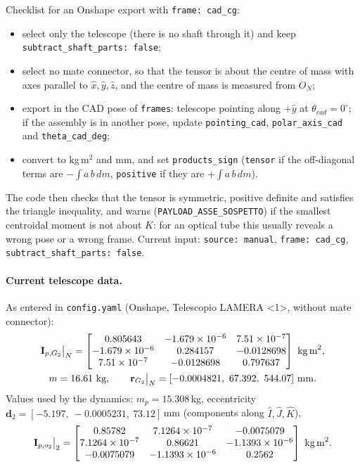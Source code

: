 \documentclass[10pt,a4paper]{article}
\numberwithin{equation}{section}
\begin{document}
Checklist for an Onshape export with \texttt{frame: cad\_cg}:
\begin{itemize}
\item select only the telescope (there is no shaft through it) and keep \texttt{subtract\_shaft\_parts: false};
\item select no mate connector, so that the tensor is about the centre of mass with axes parallel to $\hat x, \hat y, \hat z$, and the centre of mass is measured from $O_N$;
\item export in the CAD pose of \texttt{frames}: telescope pointing along $+\hat{y}$ at $\theta_{cad} = 0^\circ$; if the assembly is in another pose, update \texttt{pointing\_cad}, \texttt{polar\_axis\_cad} and \texttt{theta\_cad\_deg};
\item convert to kg\,m$^2$ and mm, and set \texttt{products\_sign} (\texttt{tensor} if the off-diagonal terms are $-\int a\,b\,dm$, \texttt{positive} if they are $+\int a\,b\,dm$).
\end{itemize}
The code then checks that the tensor is symmetric, positive definite and satisfies the triangle inequality, and warns (\texttt{PAYLOAD\_ASSE\_SOSPETTO}) if the smallest centroidal moment is not about $\hat K$: for an optical tube this usually reveals a wrong pose or a wrong frame. Current input: \texttt{source: manual}, \texttt{frame: cad\_cg}, \texttt{subtract\_shaft\_parts: false}.
\paragraph{Current telescope data.}
As entered in \texttt{config.yaml} (Onshape, Telescopio LAMERA <1>, without mate connector):
\begin{gather}\mathbf I_{p,G_2}\big|_N = \begin{bmatrix}0.805643 & -1.679\times10^{-6} & 7.51\times10^{-7} \\ -1.679\times10^{-6} & 0.284157 & -0.0128698 \\ 7.51\times10^{-7} & -0.0128698 & 0.797637\end{bmatrix}\ \text{kg\,m}^2, \\ m = 16.61\ \text{kg}, \qquad \mathbf r_{G_2}\big|_N = [-0.0004821,\ 67.392,\ 544.07]\ \text{mm}.\end{gather}
Values used by the dynamics: $m_p = 15.308$\,kg, eccentricity $\mathbf d_2 = [-5.197,\ -0.0005231,\ 73.12]$\,mm (components along $\hat I, \hat J, \hat K$),
\begin{gather}\mathbf I_{p,o_2}\big|_2 = \begin{bmatrix}0.85782 & 7.1264\times10^{-7} & -0.0075079 \\ 7.1264\times10^{-7} & 0.86621 & -1.1393\times10^{-6} \\ -0.0075079 & -1.1393\times10^{-6} & 0.2562\end{bmatrix}\ \text{kg\,m}^2 .\end{gather}
\end{document}
